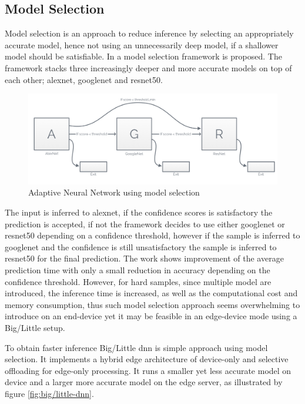 \subsection{Model Selection}

Model selection is an approach to reduce inference by selecting an appropriately accurate model, hence not using an unnecessarily deep model, if a shallower model should be satisfiable. In \cite{bolukbasi_adaptive_2017} a model selection framework is proposed. The framework stacks three increasingly deeper and more accurate models on top of each other; \gls{alexnet}, \gls{googlenet} and \gls{resnet}50. 

\begin{figure}
	\centering
	\includegraphics[width=\linewidth]{figures/models/adaptive}
	\caption[Adaptive Neural Network]{Adaptive Neural Network using model selection}
\end{figure}

The input is inferred to \gls{alexnet}, if the confidence scores is satisfactory the prediction is accepted, if not the framework decides to use either \gls{googlenet} or \gls{resnet}50 depending on a confidence threshold, however if the sample is inferred to \gls{googlenet} and the confidence is still unsatisfactory the sample is inferred to \gls{resnet}50 for the final prediction. The work shows improvement of the average prediction time with only a small reduction in accuracy depending on the confidence threshold. However, for hard samples, since multiple model are introduced, the inference time is increased, as well as the computational cost and memory consumption, thus such model selection approach seems overwhelming to introduce on an end-device yet it may be feasible in an edge-device mode using a Big/Little setup.

To obtain faster inference Big/Little \gls{dnn} \cite{park_big/little_2015} is simple approach using model selection. It implements a hybrid edge architecture of device-only and selective offloading for edge-only processing. It runs a smaller yet less accurate model on device and a larger more accurate model on the edge server, as illustrated by figure \ref{fig:big/little-dnn}. 

